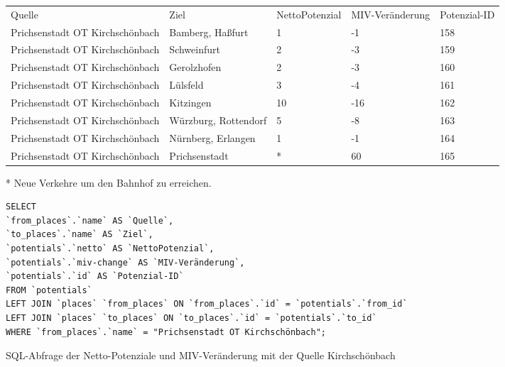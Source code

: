 \begin{tabular}{ l  l  l  l  l }
Quelle & Ziel & NettoPotenzial & MIV-Veränderung & Potenzial-ID\\ 
Prichsenstadt OT Kirchschönbach & Bamberg, Haßfurt & 1 & -1 & 158\\ 
Prichsenstadt OT Kirchschönbach & Schweinfurt & 2 & -3 & 159\\ 
Prichsenstadt OT Kirchschönbach & Gerolzhofen & 2 & -3 & 160\\ 
Prichsenstadt OT Kirchschönbach & Lülsfeld & 3 & -4 & 161\\ 
Prichsenstadt OT Kirchschönbach & Kitzingen & 10 & -16 & 162\\ 
Prichsenstadt OT Kirchschönbach & Würzburg, Rottendorf & 5 & -8 & 163\\ 
Prichsenstadt OT Kirchschönbach & Nürnberg, Erlangen & 1 & -1 & 164\\ 
Prichsenstadt OT Kirchschönbach & Prichsenstadt & * & 60 & 165\\ 
\end{tabular}
\newline
\newline
* Neue Verkehre um den Bahnhof zu erreichen.
\newline
\begin{listing}[htbp]
\begin{verbatim}
SELECT
`from_places`.`name` AS `Quelle`, 
`to_places`.`name` AS `Ziel`, 
`potentials`.`netto` AS `NettoPotenzial`, 
`potentials`.`miv-change` AS `MIV-Veränderung`, 
`potentials`.`id` AS `Potenzial-ID`
FROM `potentials`
LEFT JOIN `places` `from_places` ON `from_places`.`id` = `potentials`.`from_id`
LEFT JOIN `places` `to_places` ON `to_places`.`id` = `potentials`.`to_id`
WHERE `from_places`.`name` = "Prichsenstadt OT Kirchschönbach";
\end{verbatim}
\caption{SQL-Abfrage der Netto-Potenziale und MIV-Veränderung mit der Quelle Kirchschönbach}\label{lst-fz-kirchschoenbach}
\end{listing}